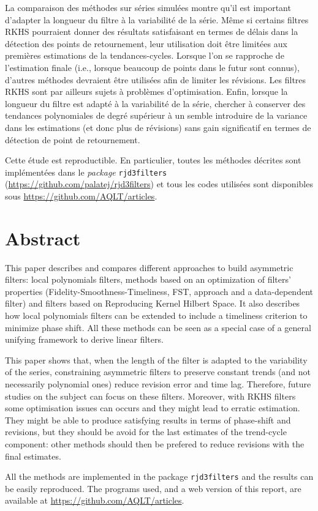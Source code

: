 La comparaison des méthodes sur séries simulées montre qu'il est
important d'adapter la longueur du filtre à la variabilité de la série.
Même si certains filtres RKHS pourraient donner des résultats
satisfaisant en termes de délais dans la détection des points de
retournement, leur utilisation doit être limitées aux premières
estimations de la tendances-cycles. Lorsque l'on se rapproche de
l'estimation finale (i.e., lorsque beaucoup de points dans le futur sont
connus), d'autres méthodes devraient être utilisées afin de limiter les
révisions. Les filtres RKHS sont par ailleurs sujets à problèmes
d'optimisation. Enfin, lorsque la longueur du filtre est adapté à la
variabilité de la série, chercher à conserver des tendances polynomiales
de degré supérieur à un semble introduire de la variance dans les
estimations (et donc plus de révisions) sans gain significatif en termes
de détection de point de retournement.

Cette étude est reproductible. En particulier, toutes les méthodes
décrites sont implémentées dans le \emph{package} 
\texttt{rjd3filters} (\url{https://github.com/palatej/rjd3filters}) et
tous les codes utilisées sont disponibles sous
\url{https://github.com/AQLT/articles}.

\hypertarget{abstract}{%
\section*{Abstract}\label{abstract}}

This paper describes and compares different approaches to build
asymmetric filters: local polynomials filters, methods based on an
optimization of filters' properties (Fidelity-Smoothness-Timeliness,
FST, approach and a data-dependent filter) and filters based on
Reproducing Kernel Hilbert Space. It also describes how local
polynomials filters can be extended to include a timeliness criterion to
minimize phase shift. All these methods can be seen as a special case of
a general unifying framework to derive linear filters.

This paper shows that, when the length of the filter is adapted to the
variability of the series, constraining asymmetric filters to preserve
constant trends (and not necessarily polynomial ones) reduce revision
error and time lag. Therefore, future studies on the subject can focus
on these filters. Moreover, with RKHS filters some optimisation issues
can occurs and they might lead to erratic estimation. They might be able
to produce satisfying results in terms of phase-shift and revisions, but
they should be avoid for the last estimates of the trend-cycle
component: other methods should then be prefered to reduce revisions
with the final estimates.

All the methods are implemented in the  package
\texttt{rjd3filters} and the results can be easily reproduced. The
programs used, and a web version of this report, are available at
\url{https://github.com/AQLT/articles}.
